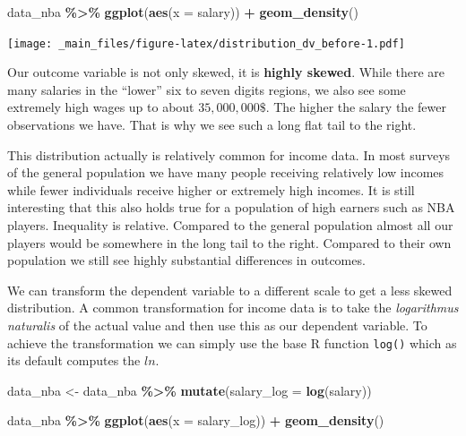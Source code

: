 \documentclass[
]{book}
\newenvironment{Shaded}{\begin{snugshade}}{\end{snugshade}}
\newcommand{\AttributeTok}[1]{\textcolor[rgb]{0.13,0.29,0.53}{#1}}
\newcommand{\FunctionTok}[1]{\textcolor[rgb]{0.13,0.29,0.53}{\textbf{#1}}}
\newcommand{\NormalTok}[1]{#1}
\newcommand{\OtherTok}[1]{\textcolor[rgb]{0.56,0.35,0.01}{#1}}
\newcommand{\SpecialCharTok}[1]{\textcolor[rgb]{0.81,0.36,0.00}{\textbf{#1}}}
\begin{document}
\begin{Shaded}
\begin{Highlighting}[]
\NormalTok{data\_nba }\SpecialCharTok{\%\textgreater{}\%} 
  \FunctionTok{ggplot}\NormalTok{(}\FunctionTok{aes}\NormalTok{(}\AttributeTok{x =}\NormalTok{ salary)) }\SpecialCharTok{+}
  \FunctionTok{geom\_density}\NormalTok{()}
\end{Highlighting}
\end{Shaded}

\texttt{[image: \_main\_files/figure-latex/distribution\_dv\_before-1.pdf]}

Our outcome variable is not only skewed, it is \textbf{highly skewed}. While
there are many salaries in the ``lower'' six to seven digits regions, we
also see some extremely high wages up to about \(35,000,000\$\). The
higher the salary the fewer observations we have. That is why we see
such a long flat tail to the right.

This distribution actually is relatively common for income data. In most
surveys of the general population we have many people receiving
relatively low incomes while fewer individuals receive higher or
extremely high incomes. It is still interesting that this also holds
true for a population of high earners such as NBA players. Inequality is
relative. Compared to the general population almost all our players
would be somewhere in the long tail to the right. Compared to their own
population we still see highly substantial differences in outcomes.

We can transform the dependent variable to a different scale to get a
less skewed distribution. A common transformation for income data is to
take the \emph{logarithmus naturalis} of the actual value and then use this
as our dependent variable. To achieve the transformation we can simply
use the base R function \texttt{log()} which as its default computes the \(ln\).

\begin{Shaded}
\begin{Highlighting}[]
\NormalTok{data\_nba }\OtherTok{\textless{}{-}}\NormalTok{ data\_nba }\SpecialCharTok{\%\textgreater{}\%} 
  \FunctionTok{mutate}\NormalTok{(}\AttributeTok{salary\_log =} \FunctionTok{log}\NormalTok{(salary))}

\NormalTok{data\_nba }\SpecialCharTok{\%\textgreater{}\%} 
  \FunctionTok{ggplot}\NormalTok{(}\FunctionTok{aes}\NormalTok{(}\AttributeTok{x =}\NormalTok{ salary\_log)) }\SpecialCharTok{+}
  \FunctionTok{geom\_density}\NormalTok{()}
\end{Highlighting}
\end{Shaded}
\end{document}
